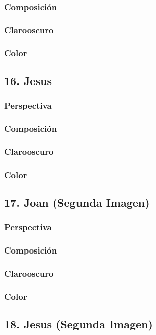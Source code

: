 \documentclass[12pt]{article}
\begin{document}
        \subsubsection{Composición}
    
        \subsubsection{Clarooscuro}
    
        \subsubsection{Color}
    \subsection{16. Jesus}
        \subsubsection{Perspectiva}
    
        \subsubsection{Composición}
    
        \subsubsection{Clarooscuro}
    
        \subsubsection{Color}
    \subsection{17. Joan (Segunda Imagen)}
        \subsubsection{Perspectiva}
    
        \subsubsection{Composición}
    
        \subsubsection{Clarooscuro}
    
        \subsubsection{Color}
    \subsection{18. Jesus (Segunda Imagen)}
        
\end{document}
